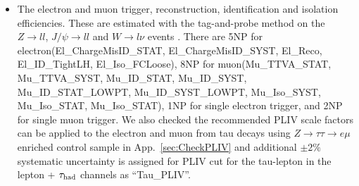 \begin{itemize}
\item The electron and muon trigger, reconstruction, identification and isolation efficiencies. These are estimated with the tag-and-probe method on the $Z\to ll$, $J/\psi\to ll$ and $W\to l\nu$ events \cite{lep_sys}. There are 5NP for electron(El\_ChargeMisID\_STAT, El\_ChargeMisID\_SYST, El\_Reco, El\_ID\_TightLH, El\_Iso\_FCLoose), 8NP for muon(Mu\_TTVA\_STAT, Mu\_TTVA\_SYST, Mu\_ID\_STAT, Mu\_ID\_SYST, Mu\_ID\_STAT\_LOWPT, Mu\_ID\_SYST\_LOWPT, Mu\_Iso\_SYST, Mu\_Iso\_STAT, Mu\_Iso\_STAT), 1NP for single electron trigger, and 2NP for single muon trigger. 
  We also checked the recommended PLIV scale factors can be applied to the electron and muon from
  tau decays using $Z\rightarrow \tau\tau\rightarrow e\mu$ enriched control sample in App.~\ref{sec:CheckPLIV} and additional $\pm 2\%$ systematic uncertainty
  is assigned for PLIV cut for the tau-lepton in the lepton + $\tau_\text{had}$ channels as ``Tau\_PLIV''.
  

\end{itemize}

